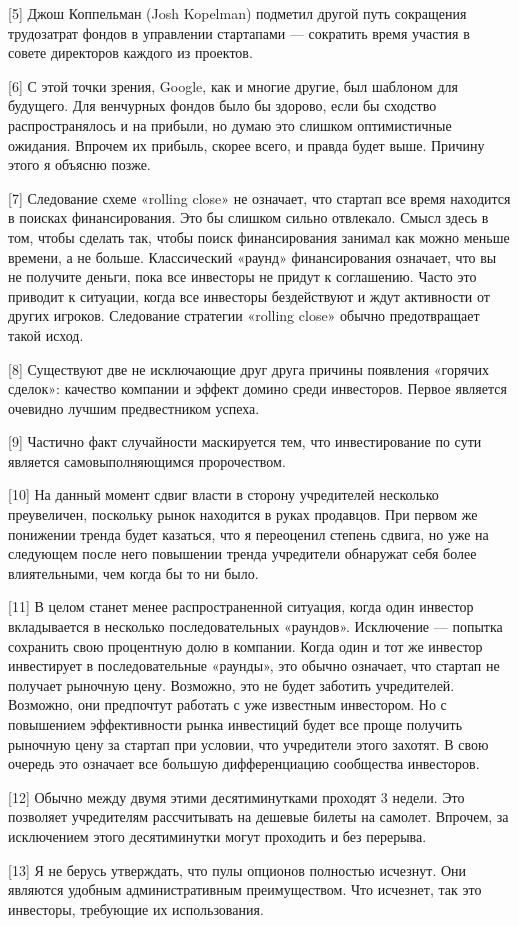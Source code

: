 \documentclass[ebook,12pt,oneside,openany]{memoir}
\begin{document}
[5] Джош Коппельман (Josh Kopelman) подметил другой путь сокращения
трудозатрат фондов в управлении стартапами — сократить время участия в
совете директоров каждого из проектов.

[6] С этой точки зрения, Google, как и многие другие, был шаблоном для
будущего. Для венчурных фондов было бы здорово, если бы сходство
распространялось и на прибыли, но думаю это слишком оптимистичные
ожидания. Впрочем их прибыль, скорее всего, и правда будет выше.
Причину этого я объясню позже.

[7] Следование схеме «rolling close» не означает, что стартап все
время находится в поисках финансирования. Это бы слишком сильно
отвлекало. Смысл здесь в том, чтобы сделать так, чтобы поиск
финансирования занимал как можно меньше времени, а не больше.
Классический «раунд» финансирования означает, что вы не получите
деньги, пока все инвесторы не придут к соглашению. Часто это приводит
к ситуации, когда все инвесторы бездействуют и ждут активности от
других игроков. Следование стратегии «rolling close» обычно
предотвращает такой исход.

[8] Существуют две не исключающие друг друга причины появления
«горячих сделок»: качество компании и эффект домино среди инвесторов.
Первое является очевидно лучшим предвестником успеха.

[9] Частично факт случайности маскируется тем, что инвестирование по
сути является самовыполняющимся пророчеством.

[10] На данный момент сдвиг власти в сторону учредителей несколько
преувеличен, поскольку рынок находится в руках продавцов. При первом
же понижении тренда будет казаться, что я переоценил степень сдвига,
но уже на следующем после него повышении тренда учредители обнаружат
себя более влиятельными, чем когда бы то ни было.

[11] В целом станет менее распространенной ситуация, когда один
инвестор вкладывается в несколько последовательных «раундов».
Исключение — попытка сохранить свою процентную долю в компании. Когда
один и тот же инвестор инвестирует в последовательные «раунды», это
обычно означает, что стартап не получает рыночную цену. Возможно, это
не будет заботить учредителей. Возможно, они предпочтут работать с уже
известным инвестором. Но с повышением эффективности рынка инвестиций
будет все проще получить рыночную цену за стартап при условии, что
учредители этого захотят. В свою очередь это означает все большую
дифференциацию сообщества инвесторов.

[12] Обычно между двумя этими десятиминутками проходят 3 недели. Это
позволяет учредителям рассчитывать на дешевые билеты на самолет.
Впрочем, за исключением этого десятиминутки могут проходить и без
перерыва.

[13] Я не берусь утверждать, что пулы опционов полностью исчезнут. Они
являются удобным административным преимуществом. Что исчезнет, так это
инвесторы, требующие их использования.
\end{document}
